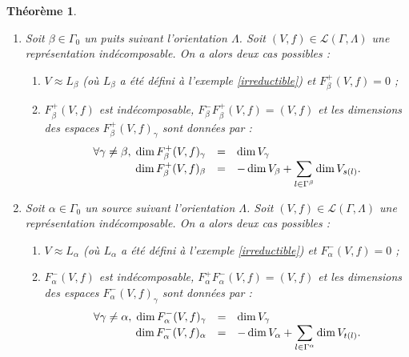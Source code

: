 \documentclass[a4paper,11pt]{article}
\newtheorem{thm}{Théorème}[section]
\newcommand{\dps}{\displaystyle}
\begin{document}
\begin{thm}
	\label{thm1}
	\begin{enumerate}
		Soit $(\Gamma,\Lambda)$ un carquois.
	\item Soit $\beta\in\Gamma_0 $ un puits suivant l'orientation $\Lambda$. Soit $(V,f)\in\mathscr L(\Gamma,\Lambda)$ une représentation indécomposable. On a alors deux cas possibles :
			\begin{enumerate}
				\item $V\approx L_\beta$ (où $L_\beta$ a été défini à l'exemple \ref{irreductible}) et $F_{\beta}^+(V,f)=0$ ;
				\item $F_\beta^+(V,f)$ est indécomposable, $F_\beta^-F_\beta^+(V,f)=(V,f)$ et les dimensions des espaces $F_\beta^+(V,f)_\gamma$ sont données par :
					\[
\begin{array}{>{\dps}r>{\dps}l>{\dps}l}
	\forall\gamma\neq\beta,\;\dim F_\beta^+(V,f)_\gamma&=& \dim V_\gamma\\
	\dim F_\beta^+(V,f)_\beta&=& -\dim V_\beta+\sum_{l\in\Gamma^{\beta}}\dim V_{s(l)}.
\end{array}
					\]
			\end{enumerate}
		\item Soit $\alpha\in\Gamma_0 $ un source suivant l'orientation $\Lambda$. Soit $(V,f)\in\mathscr L(\Gamma,\Lambda)$ une représentation indécomposable. On a alors deux cas possibles :
			\begin{enumerate}
				\item $V\approx L_\alpha$ (où $L_\alpha$ a été défini à l'exemple \ref{irreductible}) et $F_\alpha^-(V,f)=0$ ;
				\item $F_\alpha^-(V,f)$ est indécomposable, $F_\alpha^+F_\alpha^-(V,f)=(V,f)$ et les dimensions des espaces $F_\alpha^-(V,f)_\gamma$ sont données par :
					\[
\begin{array}{>{\dps}r>{\dps}l>{\dps}l}
	\forall\gamma\neq\alpha,\;\dim F_\alpha^-(V,f)_\gamma&=& \dim V_\gamma\\
	\dim F_\alpha^-(V,f)_\alpha&=& -\dim V_\alpha+\sum_{l\in\Gamma^{\alpha}}\dim V_{t(l)}.
\end{array}
					\]
			\end{enumerate}
	
	\end{enumerate}
\end{thm}
\end{document}
